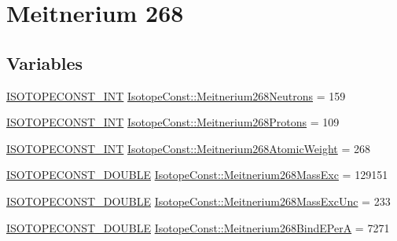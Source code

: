 \hypertarget{group___isotope_const-_meitnerium-_mt268}{}\section{Meitnerium 268}
\label{group___isotope_const-_meitnerium-_mt268}
\subsection*{Variables}
\begin{DoxyCompactItemize}
\item 
\mbox{\hyperlink{group___isotope_const-_macros_ga5f18360b3e99483a35c32d789e62621c}{I\+S\+O\+T\+O\+P\+E\+C\+O\+N\+S\+T\+\_\+\+I\+NT}} \mbox{\hyperlink{group___isotope_const-_meitnerium-_mt268_gaae0e448a0f44233b26f6b651b75e6731}{Isotope\+Const\+::\+Meitnerium268\+Neutrons}} = 159
\item 
\mbox{\hyperlink{group___isotope_const-_macros_ga5f18360b3e99483a35c32d789e62621c}{I\+S\+O\+T\+O\+P\+E\+C\+O\+N\+S\+T\+\_\+\+I\+NT}} \mbox{\hyperlink{group___isotope_const-_meitnerium-_mt268_ga858246ebfbd8446c7c82bc2666427508}{Isotope\+Const\+::\+Meitnerium268\+Protons}} = 109
\item 
\mbox{\hyperlink{group___isotope_const-_macros_ga5f18360b3e99483a35c32d789e62621c}{I\+S\+O\+T\+O\+P\+E\+C\+O\+N\+S\+T\+\_\+\+I\+NT}} \mbox{\hyperlink{group___isotope_const-_meitnerium-_mt268_gacdde936b8213f78e66805a985d0c4074}{Isotope\+Const\+::\+Meitnerium268\+Atomic\+Weight}} = 268
\item 
\mbox{\hyperlink{group___isotope_const-_macros_ga8f45a7272ce02c0b4c65c44636ed719a}{I\+S\+O\+T\+O\+P\+E\+C\+O\+N\+S\+T\+\_\+\+D\+O\+U\+B\+LE}} \mbox{\hyperlink{group___isotope_const-_meitnerium-_mt268_gacdfee199be673947c9ba60fc6cf6bd3f}{Isotope\+Const\+::\+Meitnerium268\+Mass\+Exc}} = 129151
\item 
\mbox{\hyperlink{group___isotope_const-_macros_ga8f45a7272ce02c0b4c65c44636ed719a}{I\+S\+O\+T\+O\+P\+E\+C\+O\+N\+S\+T\+\_\+\+D\+O\+U\+B\+LE}} \mbox{\hyperlink{group___isotope_const-_meitnerium-_mt268_ga28012e87128ae10bf2c1c7349fc59324}{Isotope\+Const\+::\+Meitnerium268\+Mass\+Exc\+Unc}} = 233
\item 
\mbox{\hyperlink{group___isotope_const-_macros_ga8f45a7272ce02c0b4c65c44636ed719a}{I\+S\+O\+T\+O\+P\+E\+C\+O\+N\+S\+T\+\_\+\+D\+O\+U\+B\+LE}} \mbox{\hyperlink{group___isotope_const-_meitnerium-_mt268_gad86635901a7f12c1e253cdb8fedd38aa}{Isotope\+Const\+::\+Meitnerium268\+Bind\+E\+PerA}} = 7271
\item 

\end{DoxyCompactItemize}
